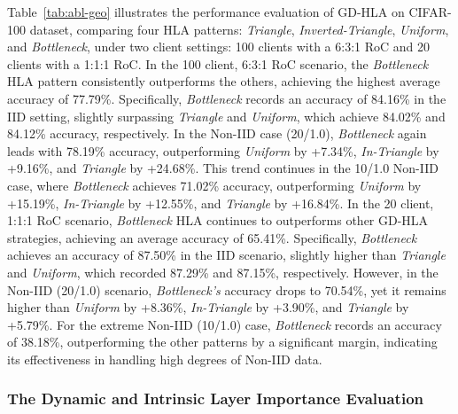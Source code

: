 \documentclass[lettersize,journal]{IEEEtran}
\begin{document}
Table~\ref{tab:abl-geo} illustrates the performance evaluation of GD-HLA on CIFAR-100 dataset, comparing four HLA patterns: \textit{Triangle}, \textit{Inverted-Triangle}, \textit{Uniform}, and \textit{Bottleneck}, under two client settings: 100 clients with a 6:3:1 RoC and 20 clients with a 1:1:1 RoC. In the 100 client, 6:3:1 RoC scenario, the \textit{Bottleneck} HLA pattern consistently outperforms the others, achieving the highest average accuracy of 77.79\%. Specifically, \textit{Bottleneck} records an accuracy of 84.16\% in the IID setting, slightly surpassing \textit{Triangle} and \textit{Uniform}, which achieve 84.02\% and 84.12\% accuracy, respectively. In the Non-IID case (20/1.0), \textit{Bottleneck} again leads with 78.19\% accuracy, outperforming \textit{Uniform} by +7.34\%, \textit{In-Triangle} by +9.16\%, and \textit{Triangle} by +24.68\%. This trend continues in the 10/1.0 Non-IID case, where \textit{Bottleneck} achieves 71.02\% accuracy, outperforming \textit{Uniform} by +15.19\%, \textit{In-Triangle} by +12.55\%, and \textit{Triangle} by +16.84\%.
In the 20 client, 1:1:1 RoC scenario, \textit{Bottleneck} HLA continues to outperforms other GD-HLA strategies, achieving an average accuracy of 65.41\%. Specifically, \textit{Bottleneck} achieves an accuracy of 87.50\% in the IID scenario, slightly higher than \textit{Triangle} and \textit{Uniform}, which recorded 87.29\% and 87.15\%, respectively. However, in the Non-IID (20/1.0) scenario, \textit{Bottleneck's} accuracy drops to 70.54\%, yet it remains higher than \textit{Uniform} by +8.36\%, \textit{In-Triangle} by +3.90\%, and \textit{Triangle} by +5.79\%. For the extreme Non-IID (10/1.0) case, \textit{Bottleneck} records an accuracy of 38.18\%, outperforming the other patterns by a significant margin, indicating its effectiveness in handling high degrees of Non-IID data.


\subsubsection{The Dynamic and Intrinsic Layer Importance Evaluation}\label{subsubsec:intrinsic-dynamic-layer-importance}
\end{document}
